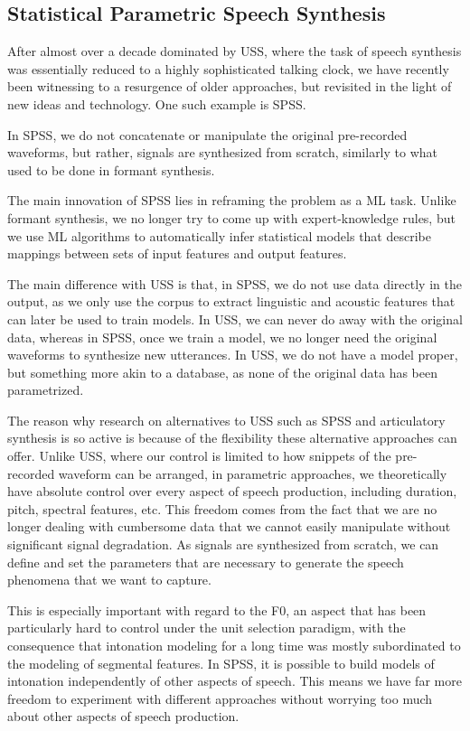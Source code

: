 \subsection{Statistical Parametric Speech Synthesis}


After almost over a decade dominated by \ac{USS}, where the task of speech synthesis was essentially reduced to a highly sophisticated talking clock, we have recently been witnessing to a resurgence of older approaches, but revisited in the light of new ideas and technology.
One such example is \ac{SPSS}.

In \ac{SPSS}, we do not concatenate or manipulate the original pre-recorded waveforms, but rather, signals are synthesized from scratch, similarly to what used to be done in formant synthesis.

The main innovation of \ac{SPSS} lies in reframing the problem as a \ac{ML} task.
Unlike formant synthesis, we no longer try to come up with expert-knowledge rules, but we use \ac{ML} algorithms to automatically infer statistical models that describe mappings between sets of input features and output features.

The main difference with \ac{USS} is that, in \ac{SPSS}, we do not use data directly in the output, as we only use the corpus to extract linguistic and acoustic features that can later be used to train models.
In \ac{USS}, we can never do away with the original data, whereas in \ac{SPSS}, once we train a model, we no longer need the original waveforms to synthesize new utterances.
In \ac{USS}, we do not have a model proper, but something more akin to a database, as none of the original data has been parametrized.

The reason why research on alternatives to \ac{USS} such as \ac{SPSS} and articulatory synthesis is so active is because of the flexibility these alternative approaches can offer.
Unlike \ac{USS}, where our control is limited to how snippets of the pre-recorded waveform can be arranged, in parametric approaches, we theoretically have absolute control over every aspect of speech production, including duration, pitch, spectral features, etc.
This freedom comes from the fact that we are no longer dealing with cumbersome data that we cannot easily manipulate without significant signal degradation.
As signals are synthesized from scratch, we can define and set the parameters that are necessary to generate the speech phenomena that we want to capture.

This is especially important with regard to the \ac{F0}, an aspect that has been particularly hard to control under the unit selection paradigm, with the consequence that intonation modeling for a long time was mostly subordinated to the modeling of segmental features.
In \ac{SPSS}, it is possible to build models of intonation independently of other aspects of speech.
This means we have far more freedom to experiment with different approaches without worrying too much about other aspects of speech production. 

